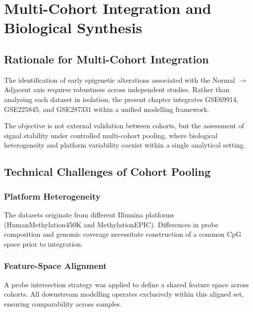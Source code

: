 \chapter{Multi-Cohort Integration and Biological Synthesis}
\label{chap:multi_cohort_integration}

\section{Rationale for Multi-Cohort Integration}

The identification of early epigenetic alterations associated with the
Normal $\rightarrow$ Adjacent axis requires robustness across
independent studies. Rather than analysing each dataset in isolation,
the present chapter integrates GSE69914, GSE225845, and GSE287331
within a unified modelling framework.

The objective is not external validation between cohorts,
but the assessment of signal stability under controlled
multi-cohort pooling, where biological heterogeneity and
platform variability coexist within a single analytical setting.

\section{Technical Challenges of Cohort Pooling}

\subsection{Platform Heterogeneity}

The datasets originate from different Illumina platforms
(HumanMethylation450K and MethylationEPIC).
Differences in probe composition and genomic coverage
necessitate construction of a common CpG space prior to integration.

\subsection{Feature-Space Alignment}

A probe intersection strategy was applied to define a shared feature
space across cohorts.
All downstream modelling operates exclusively within this aligned set,
ensuring comparability across samples.

